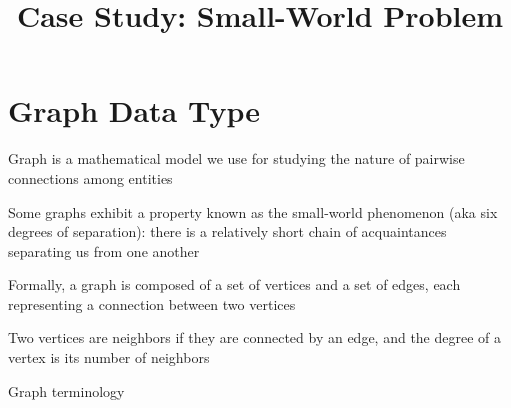 \documentclass[8pt,a4paper,compress]{beamer}
\title{Case Study: Small-World Problem}
\date{}
\begin{document}
\begin{frame}
\vfill
\titlepage
\end{frame}

\section{Graph Data Type}
\begin{frame}[fragile]
\pause

Graph is a mathematical model we use for studying the nature of pairwise connections among entities

\pause
\bigskip

Some graphs exhibit a property known as the small-world phenomenon (aka six degrees of separation): there is a relatively short chain of acquaintances separating us from one another

\pause
\bigskip

Formally, a graph is composed of a set of vertices and a set of edges, each representing a connection between two vertices

\pause
\bigskip

Two vertices are neighbors if they are connected by an edge, and the degree of a vertex is its number of neighbors

\pause
\bigskip

Graph terminology
\begin{center}
\end{center}
\end{frame}
\end{document}
